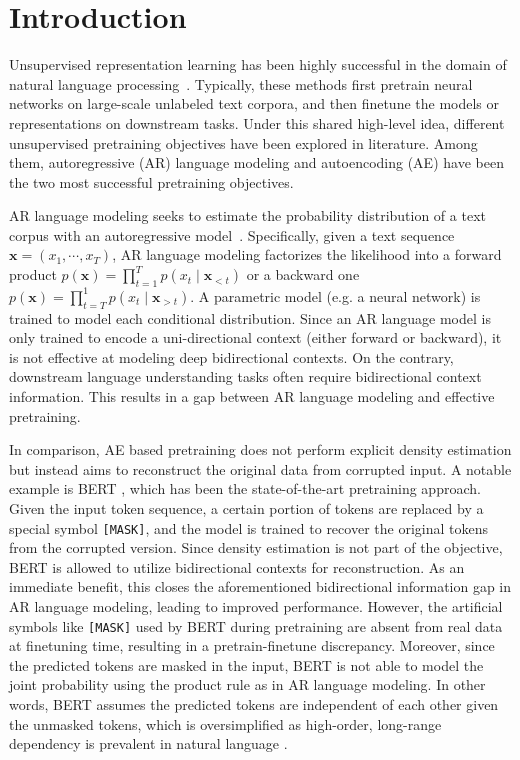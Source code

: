 
\section{Introduction}

Unsupervised representation learning has been highly successful in the domain of natural language processing~\cite{dai2015semi,mccann2017learned,peters2018deep,radford2018improving,devlin2018bert}.
Typically, these methods first pretrain neural networks on large-scale unlabeled text corpora, and then finetune the models or representations on downstream tasks.
Under this shared high-level idea, different unsupervised pretraining objectives have been explored in literature.
Among them, autoregressive (AR) language modeling and autoencoding (AE) have been the two most successful pretraining objectives.

AR language modeling seeks to estimate the probability distribution of a text corpus with an autoregressive model~\cite{dai2015semi,peters2018deep,radford2018improving}.
Specifically, given a text sequence $\mathbf{x} = (x_1, \cdots, x_T)$, AR language modeling factorizes the likelihood into a forward product $p(\mathbf{x}) = \prod_{t=1}^{T} p(x_t \mid \mathbf{x}_{<t})$ or a backward one $p(\mathbf{x}) = \prod_{t=T}^{1} p(x_t \mid \mathbf{x}_{>t})$.
A parametric model (e.g. a neural network) is trained to model each conditional distribution.
Since an AR language model is only trained to encode a uni-directional context (either forward or backward), it is not effective at modeling deep bidirectional contexts.
On the contrary, downstream language understanding tasks often require bidirectional context information. This results in a gap between AR language modeling and effective pretraining.

In comparison, AE based pretraining does not perform explicit density estimation but instead aims to reconstruct the original data from corrupted input.
A notable example is BERT \cite{devlin2018bert}, which has been the state-of-the-art pretraining approach.
Given the input token sequence, a certain portion of tokens are replaced by a special symbol \texttt{[MASK]}, and the model is trained to recover the original tokens from the corrupted version.
Since density estimation is not part of the objective, BERT is allowed to utilize bidirectional contexts for reconstruction.
As an immediate benefit, this closes the aforementioned bidirectional information gap in AR language modeling, leading to improved performance.
However, the artificial symbols like \texttt{[MASK]} used by BERT during pretraining are absent from real data at finetuning time, resulting in a pretrain-finetune discrepancy.
Moreover, since the predicted tokens are masked in the input, BERT is not able to model the joint probability using the product rule as in AR language modeling. In other words, BERT assumes the predicted tokens are independent of each other given the unmasked tokens, which is oversimplified as high-order, long-range dependency is prevalent in natural language \cite{dai2019transformer}.

